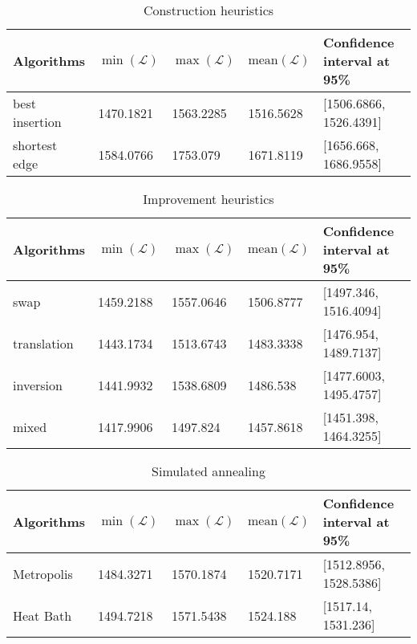 \documentclass[a4paper, 11pt]{scrartcl}
\begin{document}
\begin{table}[h]
\centering
\caption{Construction heuristics}
\label{table:construction-heuristics}
\begin{tabular}{@{}lllll@{}}
\toprule
Algorithms     & $\min(\mathcal{L})$ & $\max(\mathcal{L})$ & $\mathrm{mean}(\mathcal{L})$ & Confidence interval at 95\% \\ \midrule
best insertion & 1470.1821           & 1563.2285           & 1516.5628                    & {[}1506.6866, 1526.4391{]}  \\
shortest edge  & 1584.0766           & 1753.079            & 1671.8119                    & {[}1656.668, 1686.9558{]}   \\ \bottomrule
\end{tabular}
\end{table}


\begin{table}[h]
\centering
\caption{Improvement heuristics}
\label{table:improvement-heuristics}
\begin{tabular}{@{}lllll@{}}
\toprule
Algorithms  & $\min(\mathcal{L})$ & $\max(\mathcal{L})$ & $\mathrm{mean}(\mathcal{L})$ & Confidence interval at 95\% \\ \midrule
swap        & 1459.2188           & 1557.0646           & 1506.8777                    & [1497.346, 1516.4094]  \\
translation & 1443.1734           & 1513.6743           & 1483.3338                    & [1476.954, 1489.7137]   \\
inversion   & 1441.9932           & 1538.6809           & 1486.538                     & [1477.6003, 1495.4757]  \\
mixed       & 1417.9906           & 1497.824            & 1457.8618                    & [1451.398, 1464.3255]   \\ \bottomrule
\end{tabular}
\end{table}


\begin{table}[h]
\centering
\caption{Simulated annealing}
\label{table:simulated annealing}
\begin{tabular}{@{}lllll@{}}
\toprule
Algorithms  & $\min(\mathcal{L})$ & $\max(\mathcal{L})$ & $\mathrm{mean}(\mathcal{L})$ & Confidence interval at 95\% \\ \midrule
Metropolis  & 1484.3271           & 1570.1874           & 1520.7171                    & [1512.8956, 1528.5386]  \\
Heat Bath   & 1494.7218           & 1571.5438            & 1524.188                    & [1517.14, 1531.236]   \\ \bottomrule
\end{tabular}
\end{table}





	
\end{document}
